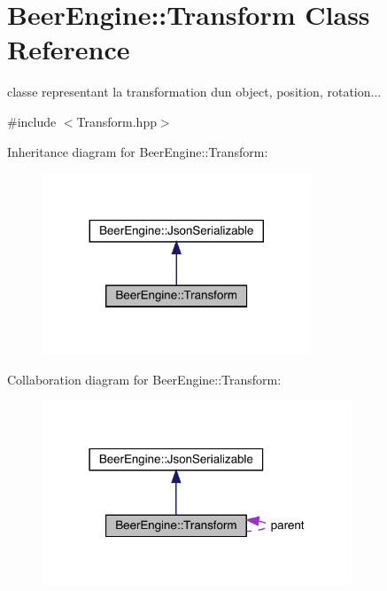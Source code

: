 \hypertarget{class_beer_engine_1_1_transform}{}\section{Beer\+Engine\+:\+:Transform Class Reference}
\label{class_beer_engine_1_1_transform}


classe representant la transformation d\textquotesingle{}un object, position, rotation...  




{\ttfamily \#include $<$Transform.\+hpp$>$}



Inheritance diagram for Beer\+Engine\+:\+:Transform\+:
\nopagebreak
\begin{figure}[H]
\begin{center}
\leavevmode
\includegraphics[width=227pt]{class_beer_engine_1_1_transform__inherit__graph}
\end{center}
\end{figure}


Collaboration diagram for Beer\+Engine\+:\+:Transform\+:
\nopagebreak
\begin{figure}[H]
\begin{center}
\leavevmode
\includegraphics[width=262pt]{class_beer_engine_1_1_transform__coll__graph}
\end{center}
\end{figure}
